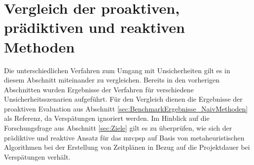\section{Vergleich der proaktiven, prädiktiven und reaktiven Methoden} \label{sec:BenchmarkVergleich}

Die unterschiedlichen Verfahren zum Umgang mit Unsicherheiten gilt es in diesem Abschnitt miteinander zu vergleichen. Bereits in den vorherigen Abschnitten wurden Ergebnisse der Verfahren für verschiedene Unsicherheitsszenarien aufgeführt. Für den Vergleich dienen die Ergebnisse der proaktiven Evaluation aus Abschnitt \ref{sec:BenchmarkErgebnisse_NaivMethoden} als Referenz, da Verspätungen ignoriert werden. Im Hinblick auf die Forschungsfrage aus Abschnitt \ref{sec:Ziele} gilt es zu überprüfen, wie sich der prädiktive und reaktive Ansatz für das \ac{mrcpsp} auf Basis von metaheuristischen Algorithmen bei der Erstellung von Zeitplänen in Bezug auf die Projektdauer bei Verspätungen verhält. 

